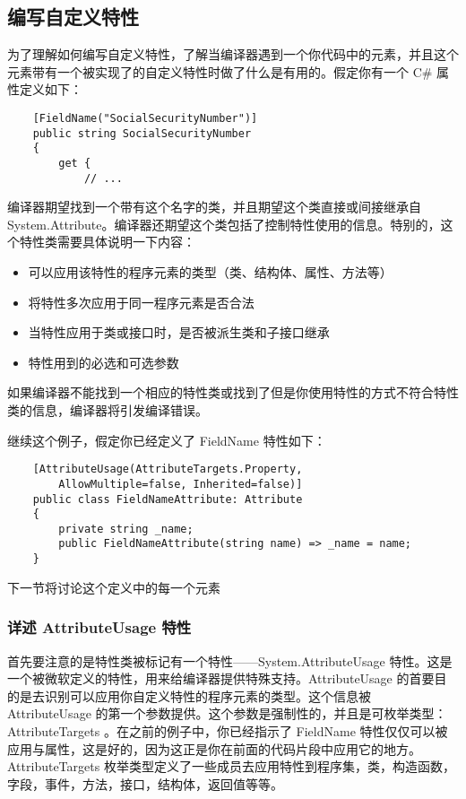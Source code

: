 \subsection{编写自定义特性}
为了理解如何编写自定义特性，了解当编译器遇到一个你代码中的元素，并且这个元素带有一个被实现了的自定义特性时做了什么是有用的。假定你有一个 C\# 属性定义如下：
\begin{verbatim}
    [FieldName("SocialSecurityNumber")]
    public string SocialSecurityNumber
    {
        get {
            // ...
\end{verbatim}
编译器期望找到一个带有这个名字的类，并且期望这个类直接或间接继承自 System.Attribute。编译器还期望这个类包括了控制特性使用的信息。特别的，这个特性类需要具体说明一下内容：
\begin{itemize}
    \item 可以应用该特性的程序元素的类型（类、结构体、属性、方法等）
    \item 将特性多次应用于同一程序元素是否合法
    \item 当特性应用于类或接口时，是否被派生类和子接口继承
    \item 特性用到的必选和可选参数
\end{itemize}
如果编译器不能找到一个相应的特性类或找到了但是你使用特性的方式不符合特性类的信息，编译器将引发编译错误。

继续这个例子，假定你已经定义了 FieldName 特性如下：
\begin{verbatim}
    [AttributeUsage(AttributeTargets.Property,
        AllowMultiple=false, Inherited=false)]
    public class FieldNameAttribute: Attribute
    {
        private string _name;
        public FieldNameAttribute(string name) => _name = name;
    }
\end{verbatim}
下一节将讨论这个定义中的每一个元素

\subsubsection{详述 AttributeUsage 特性}
首先要注意的是特性类被标记有一个特性——System.AttributeUsage 特性。这是一个被微软定义的特性，用来给编译器提供特殊支持。AttributeUsage 的首要目的是去识别可以应用你自定义特性的程序元素的类型。这个信息被 AttributeUsage 的第一个参数提供。这个参数是强制性的，并且是可枚举类型：AttributeTargets 。在之前的例子中，你已经指示了 FieldName 特性仅仅可以被应用与属性，这是好的，因为这正是你在前面的代码片段中应用它的地方。AttributeTargets 枚举类型定义了一些成员去应用特性到程序集，类，构造函数，字段，事件，方法，接口，结构体，返回值等等。

